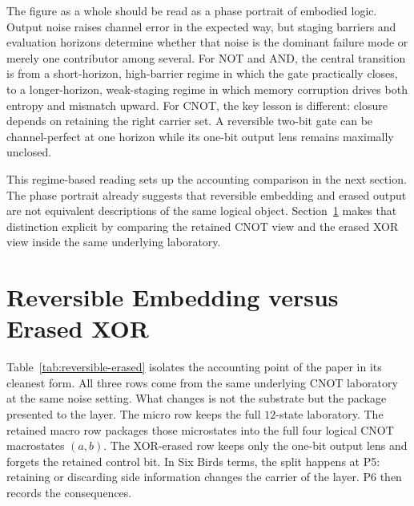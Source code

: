 \documentclass[11pt]{article}
\theoremstyle{definition}
\begin{document}
The figure as a whole should be read as a phase portrait of embodied logic. Output noise raises channel error in the expected way, but staging barriers and evaluation horizons determine whether that noise is the dominant failure mode or merely one contributor among several. For NOT and AND, the central transition is from a short-horizon, high-barrier regime in which the gate practically closes, to a longer-horizon, weak-staging regime in which memory corruption drives both entropy and mismatch upward. For CNOT, the key lesson is different: closure depends on retaining the right carrier set. A reversible two-bit gate can be channel-perfect at one horizon while its one-bit output lens remains maximally unclosed.

This regime-based reading sets up the accounting comparison in the next section. The phase portrait already suggests that reversible embedding and erased output are not equivalent descriptions of the same logical object. Section~\ref{sec:results-reversible} makes that distinction explicit by comparing the retained CNOT view and the erased XOR view inside the same underlying laboratory.
 \section{Reversible Embedding versus Erased XOR}
\label{sec:results-reversible}

Table~\ref{tab:reversible-erased} isolates the accounting point of the paper in its cleanest form. All three rows come from the same underlying CNOT laboratory at the same noise setting. What changes is not the substrate but the package presented to the layer. The micro row keeps the full \(12\)-state laboratory. The retained macro row packages those microstates into the full four logical CNOT macrostates \((a,b)\). The XOR-erased row keeps only the one-bit output lens and forgets the retained control bit. In Six Birds terms, the split happens at P5: retaining or discarding side information changes the carrier of the layer. P6 then records the consequences.
\end{document}
